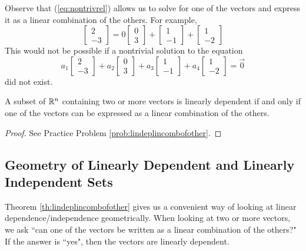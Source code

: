 \documentclass{ximera}
\begin{document}
Observe that (\ref{eq:nontrivrel}) allows us to solve for one of the vectors and express it as a linear combination of the others. For example, 
$$\begin{bmatrix}2\\-3\end{bmatrix}=0 \begin{bmatrix}0\\3\end{bmatrix}+\begin{bmatrix}1\\-1\end{bmatrix}+\begin{bmatrix}1\\-2\end{bmatrix}$$
This would not be possible if a nontrivial solution to the equation
$$a_1\begin{bmatrix}2\\-3\end{bmatrix}+a_2 \begin{bmatrix}0\\3\end{bmatrix}+a_3\begin{bmatrix}1\\-1\end{bmatrix}+a_4\begin{bmatrix}1\\-2\end{bmatrix}=\vec{0}$$
did not exist.

\begin{theorem}\label{th:lindeplincombofother}
A subset of $\mathbb{R}^n$ containing two or more vectors is linearly dependent if and only if one of the vectors can be expressed as a linear combination of the others.
\end{theorem}
\begin{proof}
See Practice Problem \ref{prob:lindeplincombofother}.
\end{proof}

\subsection*{Geometry of Linearly Dependent and Linearly Independent Sets}

Theorem \ref{th:lindeplincombofother} gives us a convenient way of looking at linear dependence/independence geometrically.  When looking at two or more vectors, we ask ``can one of the vectors be written as a linear combination of the others?"  If the answer is ``yes", then the vectors are linearly dependent.
\end{document}
